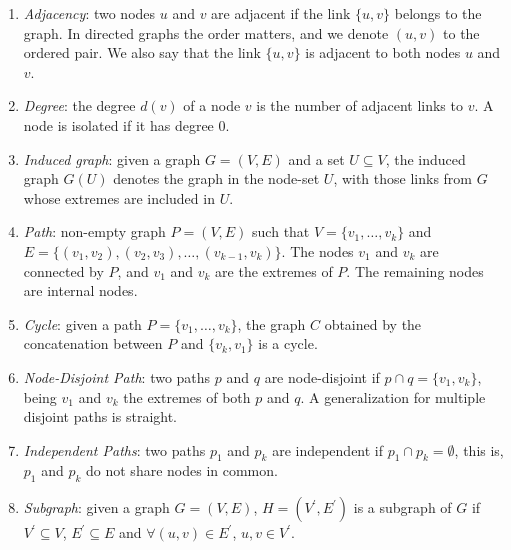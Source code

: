 \begin{enumerate}
\item \emph{Adjacency}: two nodes $u$ and $v$ are adjacent if the link $\{u,v\}$ belongs to the graph. 
In directed graphs the order matters, and we denote $(u,v)$ to the ordered pair. 
We also say that the link $\{u,v\}$ is adjacent to both nodes $u$ and $v$.

\item \emph{Degree}: the degree $d(v)$ of a node $v$ is the number of adjacent links to $v$.
A node is isolated if it has degree 0. 

\item \emph{Induced graph}: given a graph $G=(V,E)$ and a set $U \subseteq V$, 
the induced graph $G(U)$ denotes the graph in the node-set $U$, with those links 
from $G$ whose extremes are included in $U$.

\item \emph{Path}: non-empty graph $P=(V,E)$ such that $V=\{v_1,\ldots,v_k\}$ and 
$E=\{(v_1,v_2),(v_2,v_3),\ldots,(v_{k-1},v_k)\}$. The nodes $v_1$ and $v_k$ 
are connected by $P$, and $v_1$ and $v_k$ are the extremes of $P$. The remaining nodes are internal nodes.

\item \emph{Cycle}: given a path $P=\{v_1,\ldots,v_k\}$, the graph $C$ 
obtained by the concatenation between $P$ and $\{v_k,v_1\}$ is a cycle. 

\item \emph{Node-Disjoint Path}: two paths $p$ and $q$ are node-disjoint if $p \cap q = \{v_1,v_k\}$, 
being $v_1$ and $v_k$ the extremes of both $p$ and $q$. A generalization for multiple disjoint paths is straight. 

\item \emph{Independent Paths}: two paths $p_1$ and $p_k$ are independent if $p_1 \cap p_k = \emptyset$, 
this is, $p_1$ and $p_k$ do not share nodes in common.


\item \emph{Subgraph}: given a graph $G=(V,E)$, $H=(V^{\prime},E^{\prime})$ is a subgraph of $G$ if $V^{\prime} \subseteq V$, $E^{\prime} \subseteq E$ and $\forall (u,v) \in E^{\prime}$, $u,v \in V^{\prime}$. 


\end{enumerate}
